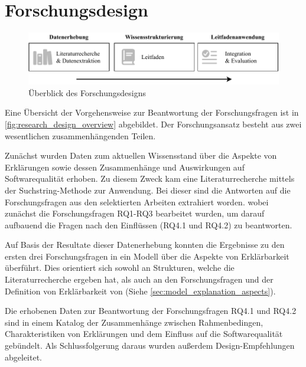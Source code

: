 \section{Forschungsdesign}
\begin{figure}[htb!]
    \begin{center}
        \includegraphics[width=\textwidth]{contents/03_research_design/res/research_design_overview.pdf}
    \end{center}
    \caption{Überblick des Forschungsdesigns}
    \label{fig:research_design_overview}
\end{figure}

Eine Übersicht der Vorgehensweise zur Beantwortung der Forschungsfragen ist in \autoref{fig:research_design_overview} abgebildet. Der Forschungsansatz besteht aus zwei wesentlichen zusammenhängenden Teilen.

Zunächst wurden Daten zum aktuellen Wissensstand über die Aspekte von Erklärungen sowie dessen Zusammenhänge und Auswirkungen auf Softwarequalität erhoben. Zu diesem Zweck kam eine Literaturrecherche mittels der Suchstring-Methode \cite{kitchenham2004procedures} zur Anwendung. Bei dieser sind die Antworten auf die Forschungsfragen aus den selektierten Arbeiten extrahiert worden. wobei zunächst die Forschungsfragen RQ1-RQ3 bearbeitet wurden, um darauf aufbauend die Fragen nach den Einflüssen (RQ4.1 und RQ4.2) zu beantworten.

Auf Basis der Resultate dieser Datenerhebung konnten die Ergebnisse zu den ersten drei Forschungsfragen in ein Modell über die Aspekte von Erklärbarkeit überführt. Dies orientiert sich sowohl an Strukturen, welche die Literaturrecherche ergeben hat, als auch an den Forschungsfragen und der Definition von Erklärbarkeit von \citeauthor{chazette_knowledge_nodate} \cite{chazette_knowledge_nodate} (Siehe \autoref{sec:model_explanation_aspects}).

Die erhobenen Daten zur Beantwortung der Forschungsfragen RQ4.1 und RQ4.2 sind in einem Katalog der Zusammenhänge zwischen Rahmenbedingen, Charakteristiken von Erklärungen und dem Einfluss auf die Softwarequalität gebündelt. Als Schlussfolgerung daraus wurden außerdem Design-Empfehlungen abgeleitet.

